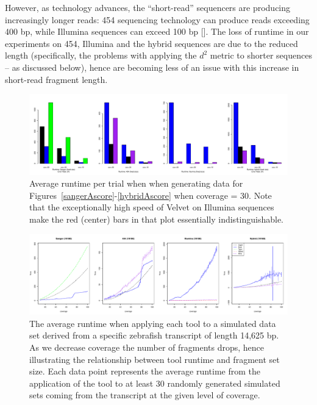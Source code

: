 \documentclass{bioinfo}
\newcommand{\velvet}{{\small Velvet}}
\begin{document}
However,
as technology advances, the ``short-read'' sequencers are producing
increasingly longer reads: 454 sequencing technology can produce
reads exceeding 400 bp, while Illumina sequences can exceed 100 bp
[\cite{Eid09,Li10}].  The loss of runtime in our experiments on 454,
Illumina and the hybrid sequences are due to the reduced length
(specifically, the problems with applying the $d^2$ metric to shorter
sequences -- as discussed below), hence are becoming less of an issue
with this increase in short-read fragment length.



\begin{figure}[htb]
\centerline{\includegraphics[width=6in]{pics.d/runtime_fixedsize_sanger.pdf}}
\caption{Average runtime per trial when when generating data for
  Figures~\ref{sangerAscore}-\ref{hybridAscore}  when coverage = 30.
  Note that the exceptionally high speed of \velvet\/ on Illumina sequences make the
  red (center) bars in that plot essentially indistinguishable.}
\label{runtime.fixed}
\end{figure}

\begin{figure}[htb]
\centerline{\includegraphics[width=6in]{pics.d/runtime_bycoverage_all.pdf}}
\caption{The average runtime when applying each tool to a simulated
  data set derived from a specific zebrafish transcript of length
  14,625 bp.  As we decrease coverage the number of fragments drops,
  hence illustrating the relationship between tool runtime and
  fragment set size.  Each data point represents the average runtime
  from the application of the tool to at least 30 randomly generated
  simulated sets coming from the transcript at the given level of
  coverage.}
\label{runtime.coverage}
\end{figure}
\end{document}
